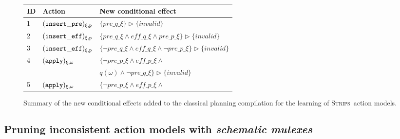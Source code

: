 \documentclass{article}
\newcommand{\strips}{\textsc{Strips}}
\begin{document}
\begin{figure}
\begin{footnotesize}
\begin{tabular}{lll}
{\bf ID} & {\bf Action} & {\bf New conditional effect}\\\hline
1&${\tt{\small (insert\_pre)_{\xi,p}}}$&$\{pre\_q\_\xi\}\rhd\{invalid\}$\\
2&${\tt{\small (insert\_eff)_{\xi,p}}}$&$\{pre\_q\_\xi\wedge eff\_q\_\xi\wedge pre\_p\_\xi\}\rhd\{invalid\}$\\
3&${\tt{\small (insert\_eff)_{\xi,p}}}$&$\{\neg pre\_q\_\xi\wedge eff\_q\_\xi\wedge \neg pre\_p\_\xi\}\rhd\{invalid\}$\\
4&${\tt{\small (apply)_{\xi,\omega}}}$&$\{\neg pre\_p\_\xi \wedge eff\_p\_\xi \wedge $\\
&&$q(\omega)\wedge \neg pre\_q\_\xi\}\rhd\{invalid\}$\\
5&${\tt{\small (apply)_{\xi,\omega}}}$&$\{\neg pre\_p\_\xi \wedge eff\_p\_\xi \wedge $\\
\end{tabular}
\end{footnotesize}
	\caption{\small Summary of the new conditional effects added to the classical planning compilation for the learning of \strips\ action models.}
	\label{fig:ceffects}
\end{figure}

\subsection{Pruning inconsistent action models with {\em schematic mutexes}}
\end{document}
